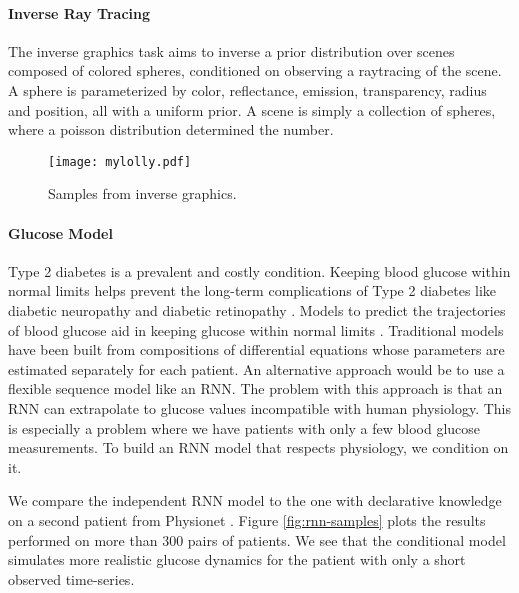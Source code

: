 \paragraph{Inverse Ray Tracing}
The inverse graphics task aims to inverse a prior distribution over scenes composed of colored spheres, conditioned on observing a raytracing of the scene.
A sphere is parameterized by color, reflectance, emission, transparency, radius and position, all with a uniform prior.  A scene is simply a collection of spheres, where a poisson distribution determined the number.


\begin{figure}
	\centering
	\texttt{[image: mylolly.pdf]}
	\caption{ Samples from inverse graphics.}
	\label{fig:invrtmcmc}
\end{figure}


\paragraph{Glucose Model}
Type 2 diabetes is a prevalent and costly condition.
Keeping blood glucose within normal limits helps prevent the
long-term complications of Type 2 diabetes like diabetic neuropathy and diabetic retinopathy \citep{brownlee2006glycemic}. Models to predict the trajectories of blood glucose aid in keeping glucose within
normal limits \citep{zeevi2015personalized}. Traditional models have been built from compositions of differential equations \citep{albers2017personalized,levine2017offline} whose parameters are estimated separately for each patient. An alternative approach would be to use a flexible sequence model like an RNN. The problem with this approach is that an RNN can extrapolate to glucose values incompatible with human physiology. This is especially a problem where we have patients with only a few blood glucose measurements. To build an RNN model that respects physiology, we condition on it.

We compare the independent RNN model to the one with declarative knowledge on a second patient from Physionet \citep{moody2001physionet}.
Figure \ref{fig:rnn-samples} plots the results performed on more than 300 pairs of patients.
We see that the conditional model simulates
more realistic glucose dynamics for the patient 
with only a short observed time-series.

